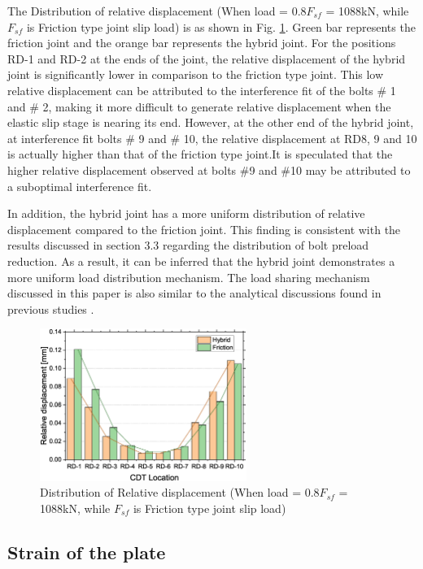 The Distribution of relative displacement (When load = 0.8$F_{sf}$ = 1088kN, while $F_{sf}$ is Friction type joint slip load) is as shown in Fig. \ref{fig-rdbar}. Green bar represents the friction joint and the orange bar represents the hybrid joint. For the positions RD-1 and RD-2 at the ends of the joint, the relative displacement of the hybrid joint is significantly lower in comparison to the friction type joint. This low relative displacement can be attributed to the interference fit of the bolts \# 1 and \# 2, making it more difficult to generate relative displacement when the elastic slip stage is nearing its end. However, at the other end of the hybrid joint, at interference fit bolts \# 9 and \# 10, the relative displacement at RD8, 9 and 10 is actually higher than that of the friction type joint.It is speculated that the higher relative displacement observed at bolts \#9 and \#10 may be attributed to a suboptimal interference fit.

In addition, the hybrid joint has a more uniform distribution of relative displacement compared to the friction joint. This finding is consistent with the results discussed in section 3.3 regarding the distribution of bolt preload reduction. As a result, it can be inferred that the hybrid joint demonstrates a more uniform load distribution mechanism. The load sharing mechanism discussed in this paper is also similar to the analytical discussions found in previous studies \cite{Chen2023MechanicalConnections}.

\begin{figure}[htbp]
    \centering
    \includegraphics[width=0.6\textwidth]{imgs/ch6/RD-bar.eps}
    \caption{Distribution of Relative displacement (When load = 0.8$F_{sf}$ = 1088kN, while $F_{sf}$ is Friction type joint slip load) }
    \label{fig-rdbar}
\end{figure}

\subsection{Strain of the plate}

